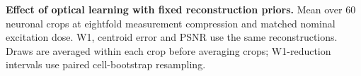 \begin{table}[t]
\centering\small

\caption{\textbf{Effect of optical learning with fixed reconstruction priors.} Mean over 60 neuronal crops at eightfold measurement compression and matched nominal excitation dose. W1, centroid error and PSNR use the same reconstructions. Draws are averaged within each crop before averaging crops; W1-reduction intervals use paired cell-bootstrap resampling.}
\label{tab:anyprior}
\end{table}
